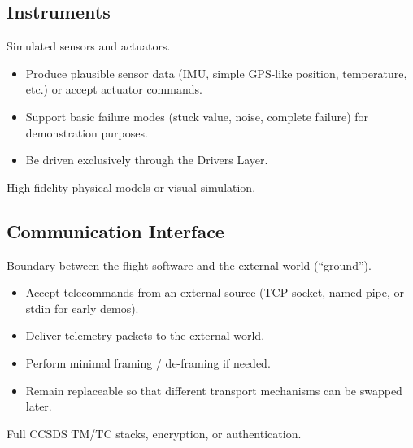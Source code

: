 \documentclass[11pt,a4paper]{article}
\begin{document}
\subsection{Instruments}
\begin{description}[style=nextline, leftmargin=1.5em]
    \item[Primary role] Simulated sensors and actuators.
    \item[Responsibilities]
    \begin{itemize}
        \item Produce plausible sensor data (IMU, simple GPS-like position, temperature, etc.) or accept actuator commands.
        \item Support basic failure modes (stuck value, noise, complete failure) for demonstration purposes.
        \item Be driven exclusively through the Drivers Layer.
    \end{itemize}
    \item[Non-responsibilities] High-fidelity physical models or visual simulation.
\end{description}

\subsection{Communication Interface}
\begin{description}[style=nextline, leftmargin=1.5em]
    \item[Primary role] Boundary between the flight software and the external world (``ground'').
    \item[Responsibilities]
    \begin{itemize}
        \item Accept telecommands from an external source (TCP socket, named pipe, or stdin for early demos).
        \item Deliver telemetry packets to the external world.
        \item Perform minimal framing / de-framing if needed.
        \item Remain replaceable so that different transport mechanisms can be swapped later.
    \end{itemize}
    \item[Non-responsibilities] Full CCSDS TM/TC stacks, encryption, or authentication.
\end{description}

\end{document}
